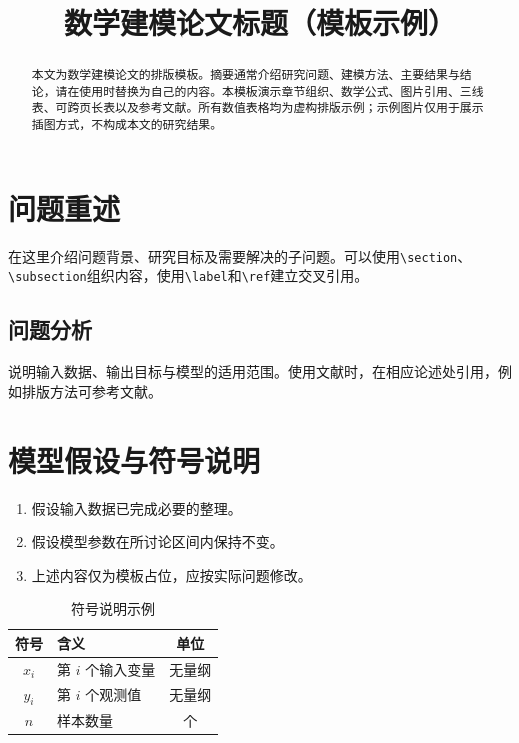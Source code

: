 \documentclass[bwprint]{gmcmthesis}
\title{数学建模论文标题（模板示例）}
\numberwithin{figure}{section}
\numberwithin{table}{section}
\numberwithin{equation}{section}
\begin{document}
\maketitle
\begin{abstract}
本文为数学建模论文的排版模板。摘要通常介绍研究问题、建模方法、主要结果与结论，请在使用时替换为自己的内容。本模板演示章节组织、数学公式、图片引用、三线表、可跨页长表以及参考文献。所有数值表格均为虚构排版示例；示例图片仅用于展示插图方式，不构成本文的研究结果。
\end{abstract}
\tableofcontents
\clearpage

\section{问题重述}
在这里介绍问题背景、研究目标及需要解决的子问题。可以使用\verb|\section|、\verb|\subsection|组织内容，使用\verb|\label|和\verb|\ref|建立交叉引用。
\subsection{问题分析}
说明输入数据、输出目标与模型的适用范围。使用文献时，在相应论述处引用，例如排版方法可参考文献\cite{latex-book}。

\section{模型假设与符号说明}
\begin{enumerate}
\item 假设输入数据已完成必要的整理。
\item 假设模型参数在所讨论区间内保持不变。
\item 上述内容仅为模板占位，应按实际问题修改。
\end{enumerate}
\begin{table}[htbp]
\centering
\caption{符号说明示例}\label{tab:symbols}
\begin{tabularx}{.85\linewidth}{cYc}
\toprule
符号 & 含义 & 单位 \\
\midrule
$x_i$ & 第 $i$ 个输入变量 & 无量纲 \\
$y_i$ & 第 $i$ 个观测值 & 无量纲 \\
$n$ & 样本数量 & 个 \\
\bottomrule
\end{tabularx}
\end{table}
\end{document}
